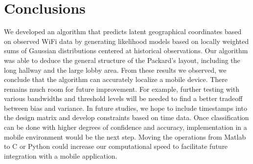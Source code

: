\section{Conclusions}

We developed an algorithm that predicts latent geographical
coordinates based on observed WiFi data by generating likelihood
models based on locally weighted sums of Gaussian distributions
centered at historical observations.
Our algorithm was able to deduce the general structure of the
Packard's layout, including the long hallway and the large lobby area.
From these results we observed, we conclude that the algorithm can
accurately localize a mobile device.
There remains much room for future improvement. For example, further testing
with various bandwidths and threshold levels will be
needed to find a better tradeoff between bias and variance. In future
studies, we hope to include timestamps into the design matrix and
develop constraints based on time data.
Once classification can be done with higher degrees of confidence and accuracy,
implementation in a mobile environment would be the next step. Moving the operations
from Matlab to C or Python could increase our computational speed to facilitate
future integration with a mobile application.

